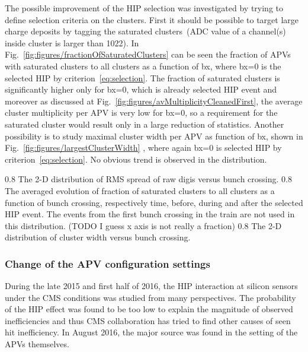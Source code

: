The possible improvement of the HIP selection was investigated by trying to define selection criteria on the clusters. First it should be possible to target large charge deposits by tagging the saturated clusters~(ADC value of a channel(s) inside cluster is larger than 1022). In Fig.~\ref{fig:figures/fractionOfSaturatedClusters} can be seen the fraction of APVs with saturated clusters to all clusters as a function of bx, where bx=0 is the selected HIP by criterion~\ref{eq:selection}. The fraction of saturated clusters is significantly higher only for bx=0, which is already selected HIP event and moreover as discussed at Fig.~\ref{fig:figures/avMultiplicityCleanedFirst}, the average cluster multiplicity per APV is very low for bx=0, so a requirement for the saturated cluster would result only in a large reduction of statistics. Another possibility is to study maximal cluster width per APV as function of bx, shown in Fig.~\ref{fig:figures/largestClusterWidth} , where again bx=0 is selected HIP by criterion~\ref{eq:selection}. No obvious trend is observed in the distribution. 

                 {0.8}       %
                 {The 2-D distribution of RMS spread of raw digis versus bunch crossing. } %
                 {0.8}       %
                 {The averaged evolution of fraction of saturated clusters to all clusters as a function of bunch crossing, respectively time, before, during and after the selected HIP event.  The events from the first bunch crossing in the train are not used in this distribution. (TODO I guess x axis is not really a fraction) } %
                 {0.8}       %
                 {The 2-D distribution of cluster width versus bunch crossing. } %


\subsubsection{Change of the APV configuration settings}

During the late 2015 and first half of 2016, the HIP interaction at silicon sensors under the CMS conditions was studied from many perspectives. The probability of the HIP effect was found to be too low to explain the magnitude of observed inefficiencies and thus CMS collaboration has tried to find other causes of seen hit inefficiency. In August 2016, the major source was found in the setting of the APVs themselves.


